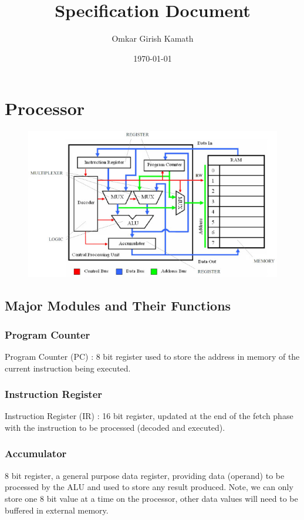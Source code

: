 \documentclass[11pt]{article}
\author{Omkar Girish Kamath}
\date{\today}
\title{Specification Document}
\begin{document}
\maketitle
\tableofcontents
\vspace*{40mm}
\section{Processor}
\begin{figure}[!h]
  \begin{center}
    \caption{}
    \includegraphics[scale=0.5]{top_view.jpg}
  \end{center}
\end{figure}
\subsection{Major Modules and Their Functions}
\subsubsection{Program Counter}
Program Counter (PC) : 8 bit register used to store the address in memory of the current instruction being executed.
\subsubsection{Instruction Register}
Instruction Register (IR) : 16 bit register, updated at the end of the fetch phase with the instruction to be processed (decoded and executed).
\subsubsection{Accumulator }
8 bit register, a general purpose data register, providing data (operand) to be processed by the ALU and used to store any result produced. Note, we can only store one 8 bit value at a time on the processor, other data values will need to be buffered in external memory.
\end{document}
